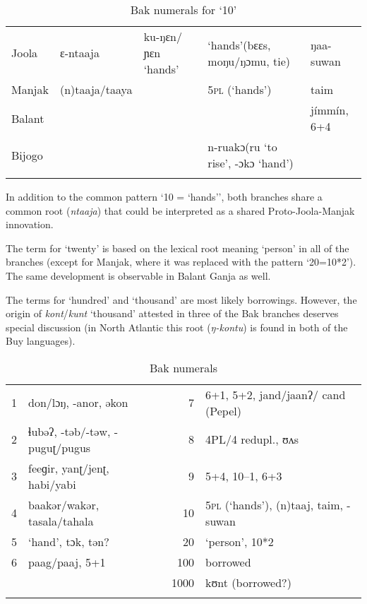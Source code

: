 
\begin{table}
\caption{\label{tab:3:246}Bak numerals for `10'}


\begin{tabularx}{\textwidth}{llQQl}
\lsptoprule

{Joola} & ɛ-ntaaja\footnotemark{} & ku-ŋɛn/ɲɛn `hands' & `hands'\newline (bɛɛs, moŋu/ŋɔmu, tie) & ŋaa-suwan\\
{Manjak} & (n)taaja/taaya &  & 5\textsc{pl} (‘hands’) & taim\\
{Balant} &  &  &  & jímmín, 6+4\\
{Bijogo} &  &  & n-ruakɔ\newline (ru ‘to rise’, -ɔkɔ ‘hand’) & \\
\lspbottomrule
\end{tabularx}
\end{table}

In addition to the common pattern ‘10 = ‘hands’’, both branches share a common root (\textit{ntaaja}) that could be interpreted as a shared Proto-Joola-Manjak innovation.


The term for ‘twenty’ is based on the lexical root meaning ‘person’ in all of the branches (except for Manjak, where it was replaced with the pattern ‘20=10*2’). The same development is observable in Balant Ganja as well.

The terms for ‘hundred’ and ‘thousand’ are most likely borrowings. However, the origin of \textit{kont}/\textit{kunt} ‘thousand’ attested in three of the Bak branches deserves special discussion (in North Atlantic this root (\textit{ŋ-kontu}) is found in both of the Buy languages).


\begin{table}
\caption{\label{tab:3:247}Bak numerals}


\begin{tabularx}{\textwidth}{ll@{}rQ}
\lsptoprule

1 & don/lɔŋ, -anor, əkon & 7 & 6+1, 5+2, jand/{jaanʔ/} cand (Pepel)\\
2 & ɬubəʔ, -təb/-təw, -puguʈ/pugus & 8 & 4PL/4 redupl., {ʊʌs}\\
3 & feeɡir, yanʈ/{jenʈ,} habi/yabi & 9 & 5+4, 10--1, 6+3\\
4 & baakər/wakər, tasala/tahala & 10 & 5\textsc{pl} (‘hands’), (n)taaj, taim, -suwan\\
5 & ‘hand’, tɔk, tən? & 20 & ‘person’, 10*2\\
6 & paag/paaj, 5+1 & 100 & borrowed\\
&  & 1000 & kʊnt (borrowed?)\\
\lspbottomrule
\end{tabularx}
\end{table}

